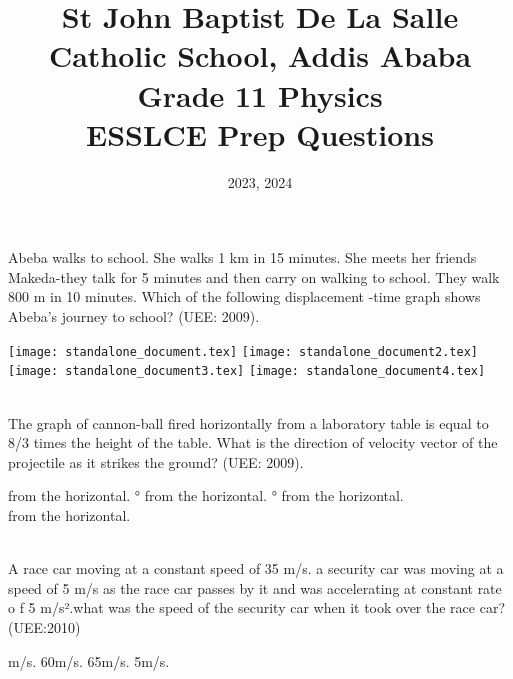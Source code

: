 \documentclass[12pt,addpoints]{exam}
\date{2023, 2024}
\begin{document}
	\title{St John Baptist De La Salle Catholic School, Addis Ababa\\
		\large Grade 11 Physics  \\
		ESSLCE Prep Questions}
	\maketitle
					\begin{questions}
					\question Abeba walks to school. She walks 1 km in 15 minutes. She meets her friends Makeda-they talk for 5 minutes and then carry on walking to school. They walk 800 m in 10 minutes. Which of the following displacement -time graph shows Abeba's journey to school? (UEE: 2009).\\
					\begin{oneparchoices}
						\choice \texttt{[image: standalone\_document.tex]}
						\choice \texttt{[image: standalone\_document2.tex]} \\
						\choice \texttt{[image: standalone\_document3.tex]} 
						\choice \texttt{[image: standalone\_document4.tex]}
						
					\end{oneparchoices}	\\
					
					\question The graph of cannon-ball fired horizontally from a laboratory table is equal to 8/3 times the height of the table. What is the direction of velocity vector of the projectile as it strikes the ground? (UEE: 2009). \\
					\begin{oneparchoices}
						 from the horizontal.
						° from the horizontal.
						° from the horizontal. \\
						 from the horizontal.
					\end{oneparchoices}\\
					
					\question   A race car moving at a constant speed of 35 m/s. a security car was moving at a speed of 5 m/s as the race car passes by it and was accelerating at constant rate o f 5 m/s².what was the speed of the security car when it took over the race car?(UEE:2010) \\
                    \begin{oneparchoices}
					\choice 35 m/s.
                        \choice 60m/s.
                        \choice 65m/s.
                        \choice 5m/s.
                     \end{oneparchoices}\\
                     

\end{questions}
\end{document}
